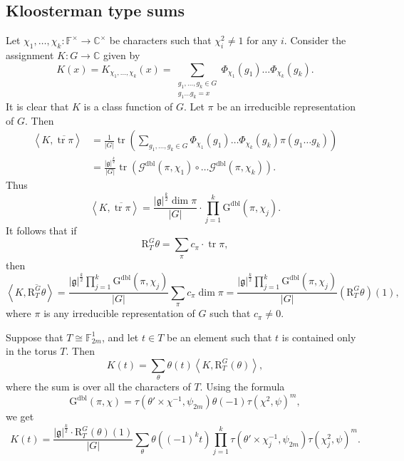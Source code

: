 \documentclass[12pt, reqno]{amsart}
\theoremstyle{definition}
\theoremstyle{definition}
\theoremstyle{definition}
\newcommand{\cComplex}{\mathbb{C}}
\newcommand{\multiplicativegroup}[1]{#1^{\times}}
\newcommand{\conjugate}[1]{\overline{#1}}
\newcommand{\sizeof}[1]{\left|#1\right|}
\newcommand{\innerproduct}[2]{\left\langle #1,#2\right\rangle}
\newcommand{\fieldCharacter}{\psi}
\newcommand{\trace}{\operatorname{tr}}
\newcommand{\finiteField}{\mathbb{F}}
\newcommand{\finiteFieldExtension}[1]{\finiteField_{#1}}
\newcommand{\dblGaussSum}[2]{\mathcal{G}^{\mathrm{dbl}}\left(#1, #2\right)}
\newcommand{\dblGaussSumScalar}[2]{\mathrm{G}^{\mathrm{dbl}}\left(#1, #2\right)}
\newcommand{\lieAlgebra}{\mathfrak{g}}
\newcommand{\DeligneLusztigInduction}[2]{\mathrm{R}_{#1}^{#2}}
\begin{document}
\subsection{Kloosterman type sums}

Let $\chi_1, \dots, \chi_k \colon \multiplicativegroup{\finiteField} \to \multiplicativegroup{\cComplex}$ be characters such that $\chi_i^2 \ne 1$ for any $i$. Consider the assignment $K \colon G \to \cComplex$ given by $$K\left(x\right) = K_{\chi_1,\dots,\chi_k}\left(x\right) = \sum_{\substack{g_1, \dots, g_k \in G\\
g_1 \dots g_k = x}} \Phi_{\chi_1}\left(g_1\right) \dots \Phi_{\chi_k}\left(g_k\right).$$
It is clear that $K$ is a class function of $G$. Let $\pi$ be an irreducible representation of $G$. Then \begin{align*}
	 \innerproduct{K}{\conjugate{\trace \pi}} &= \frac{1}{\sizeof{G}}\trace \left(\sum_{g_1,\dots,g_k \in G} \Phi_{\chi_1}\left(g_1\right) \dots \Phi_{\chi_k}\left(g_k\right) \pi\left(g_1 \dots g_k\right) \right) \\
	 &= \frac{\sizeof{\lieAlgebra}^{\frac{k}{2}}}{\sizeof{G}} \trace\left( \dblGaussSum{\pi}{\chi_1} \circ \dots \dblGaussSum{\pi}{\chi_k} \right).
\end{align*}
Thus $$\innerproduct{K}{\conjugate{\trace \pi}} = \frac{\sizeof{\lieAlgebra}^{\frac{k}{2}} \dim \pi}{\sizeof{G}} \cdot \prod_{j=1}^k \dblGaussSumScalar{\pi}{\chi_j}.$$
It follows that if
$$\DeligneLusztigInduction{T}{G}\theta = \sum_{\pi} c_{\pi} \cdot \trace \pi,$$
then $$\innerproduct{K}{\conjugate{\DeligneLusztigInduction{T}{G}\theta}} = \frac{\sizeof{\lieAlgebra}^{\frac{k}{2}} \prod_{j=1}^k \dblGaussSumScalar{\pi}{\chi_j}}{\sizeof{G}} \sum_{\pi} c_{\pi} \dim \pi = \frac{\sizeof{\lieAlgebra}^{\frac{k}{2}} \prod_{j=1}^k \dblGaussSumScalar{\pi}{\chi_j}}{\sizeof{G}} \left(\DeligneLusztigInduction{T}{G}\theta\right)\left(1\right),$$
where $\pi$ is any irreducible representation of $G$ such that $c_{\pi} \ne 0$.

Suppose that $T \cong \finiteFieldExtension{2m}^1$, and let $t \in T$ be an element such that $t$ is contained only in the torus $T$. Then
$$K\left(t\right) = \sum_{\theta} \theta\left(t\right) \innerproduct{K}{\DeligneLusztigInduction{T}{G}\left(\theta\right)},$$
where the sum is over all the characters of $T$. Using the formula $$\dblGaussSumScalar{\pi}{\chi} = \tau\left( \theta' \times \chi^{-1}, \fieldCharacter_{2m} \right) \theta\left(-1\right) \tau\left(\chi^2, \fieldCharacter\right)^m,$$
we get
$$K\left(t\right) = \frac{\sizeof{\lieAlgebra}^{\frac{k}{2}} \cdot \DeligneLusztigInduction{T}{G}\left(\theta\right)\left(1\right)}{\sizeof{G}} \sum_{\theta} \theta\left( \left(-1\right)^k t\right) \prod_{j=1}^k \tau\left(\theta' \times \chi_j^{-1}, \fieldCharacter_{2m}\right) \tau\left(\chi_j^2, \fieldCharacter\right)^m.$$
\end{document}
